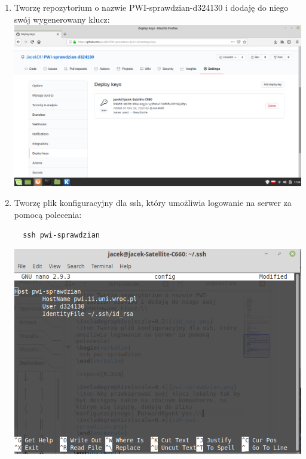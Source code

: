 \documentclass{article}
\begin{document}
\begin{enumerate}
 \item Tworzę repozytorium o nazwie PWI-sprawdzian-d324130 i dodaję do niego swój wygenerowany klucz:\\
 
 \includegraphics[scale=0.2]{add_key.png}
 \item Tworzę plik konfiguracyjny dla ssh, który umożliwia logowanie na serwer za pomocą polecenia:
 \begin{verbatim}
  ssh pwi-sprawdzian
 \end{verbatim}
 \includegraphics[scale=0.4]{config.png}
 \vspace{0.3cm}
 

\end{enumerate}
\end{document}
